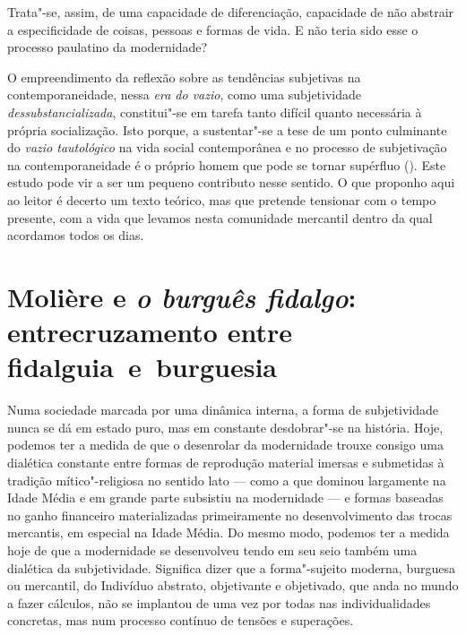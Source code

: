 Trata"-se, assim, de uma capacidade de diferenciação, capacidade de não
abstrair a especificidade de coisas, pessoas e formas de vida. E não
teria sido esse o processo paulatino da modernidade?

O empreendimento da reflexão sobre as tendências subjetivas na
contemporaneidade, nessa \emph{era do vazio}, como uma subjetividade
\emph{dessubstancializada}, constitui"-se em tarefa tanto difícil quanto
necessária à própria socialização. Isto porque, a sustentar"-se a
tese de um ponto culminante do \emph{vazio tautológico} na vida social
contemporânea e no processo de subjetivação na contemporaneidade é o próprio homem que
pode se tornar supérfluo (). Este estudo pode vir a ser um pequeno
contributo nesse sentido. O que proponho aqui ao leitor é decerto um texto teórico,
mas que pretende tensionar com o tempo presente, com a vida que levamos nesta
comunidade mercantil dentro da qual acordamos todos os dias.

\chapter*{Molière e \emph{o burguês fidalgo}: entrecruzamento entre fidalguia~e~burguesia}

Numa sociedade marcada por uma dinâmica interna, a forma de
subjetividade nunca se dá em estado puro, mas em constante desdobrar"-se
na história. Hoje, podemos ter a medida de que o desenrolar da
modernidade trouxe consigo uma dialética constante entre formas de
reprodução material imersas e submetidas à tradição mítico"-religiosa no
sentido lato --- como a que dominou largamente na Idade Média e em grande
parte subsistiu na modernidade --- e formas baseadas no ganho financeiro
materializadas primeiramente no desenvolvimento das trocas mercantis, em
especial na Idade Média. Do mesmo modo, podemos ter a medida hoje de que
a modernidade se desenvolveu tendo em seu seio também uma dialética da
subjetividade. Significa dizer que a forma"-sujeito moderna, burguesa ou
mercantil, do Indivíduo abstrato, objetivante e objetivado, que anda no
mundo a fazer cálculos, não se implantou de
uma vez por todas nas individualidades concretas, mas num processo
contínuo de tensões e superações.

